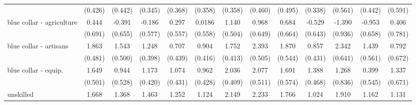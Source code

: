 {\begin{tabular}{l*{12}{c}}
                    &     (0.426)         &     (0.442)         &     (0.345)         &     (0.368)         &     (0.358)         &     (0.358)         &     (0.460)         &     (0.495)         &     (0.338)         &     (0.561)         &     (0.442)         &     (0.591)         \\
[1em]
blue collar - agriculture&       0.444         &      -0.391         &      -0.186         &       0.297         &      0.0186         &       1.140\sym{*}  &       0.968         &       0.684         &      -0.529         &      -1.390         &      -0.953         &       0.406         \\
                    &     (0.691)         &     (0.655)         &     (0.577)         &     (0.557)         &     (0.558)         &     (0.504)         &     (0.649)         &     (0.664)         &     (0.643)         &     (0.936)         &     (0.658)         &     (0.781)         \\
[1em]
blue collar - artisans&       1.863\sym{***}&       1.543\sym{**} &       1.248\sym{**} &       0.707         &       0.904\sym{*}  &       1.752\sym{***}&       2.393\sym{***}&       1.870\sym{***}&       0.857\sym{*}  &       2.342\sym{***}&       1.439\sym{*}  &       0.792         \\
                    &     (0.481)         &     (0.500)         &     (0.398)         &     (0.439)         &     (0.416)         &     (0.413)         &     (0.505)         &     (0.544)         &     (0.431)         &     (0.641)         &     (0.561)         &     (0.672)         \\
[1em]
blue collar - equip.&       1.649\sym{***}&       0.944         &       1.173\sym{**} &       1.074\sym{*}  &       0.962\sym{*}  &       2.036\sym{***}&       2.077\sym{***}&       1.691\sym{**} &       1.388\sym{**} &       1.268         &       0.399         &       1.337\sym{*}  \\
                    &     (0.501)         &     (0.528)         &     (0.420)         &     (0.431)         &     (0.428)         &     (0.409)         &     (0.511)         &     (0.574)         &     (0.468)         &     (0.836)         &     (0.545)         &     (0.671)         \\
[1em]
unskilled           &       1.668\sym{***}&       1.368\sym{**} &       1.463\sym{***}&       1.252\sym{***}&       1.124\sym{**} &       2.149\sym{***}&       2.233\sym{***}&       1.766\sym{***}&       1.024\sym{**} &       1.910\sym{***}&       1.162\sym{**} &       1.131         \\

\end{tabular}}
